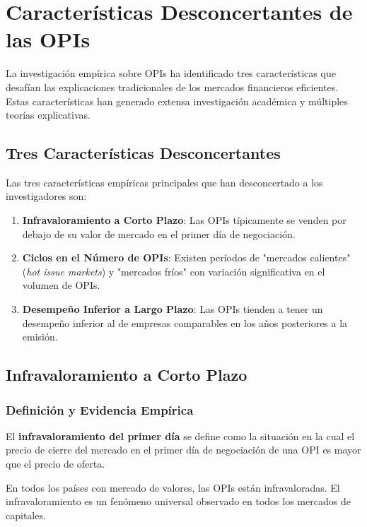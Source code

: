\section{Características Desconcertantes de las OPIs}

La investigación empírica sobre OPIs ha identificado tres características que desafían las explicaciones tradicionales de los mercados financieros eficientes. Estas características han generado extensa investigación académica y múltiples teorías explicativas.

\subsection{Tres Características Desconcertantes}

Las tres características empíricas principales que han desconcertado a los investigadores son:

\begin{enumerate}
\item \textbf{Infravaloramiento a Corto Plazo}: Las OPIs típicamente se venden por debajo de su valor de mercado en el primer día de negociación.
\item \textbf{Ciclos en el Número de OPIs}: Existen períodos de "mercados calientes" (\textit{hot issue markets}) y "mercados fríos" con variación significativa en el volumen de OPIs.
\item \textbf{Desempeño Inferior a Largo Plazo}: Las OPIs tienden a tener un desempeño inferior al de empresas comparables en los años posteriores a la emisión.
\end{enumerate}

\subsection{Infravaloramiento a Corto Plazo}

\subsubsection{Definición y Evidencia Empírica}

\begin{definicion}
El \textbf{infravaloramiento del primer día} se define como la situación en la cual el precio de cierre del mercado en el primer día de negociación de una OPI es mayor que el precio de oferta.
\end{definicion}

\begin{proposicion}
En todos los países con mercado de valores, las OPIs están infravaloradas. El infravaloramiento es un fenómeno universal observado en todos los mercados de capitales.
\end{proposicion}

